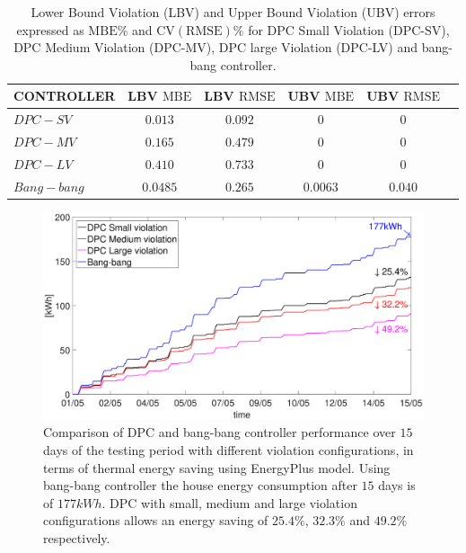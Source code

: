 \begin{table}[t!]
	\centering
	\begin{tabular}{lccccc}
		\toprule
		CONTROLLER  & LBV $\mathrm{MBE}$  & LBV $\mathrm{RMSE}$ & UBV $\mathrm{MBE}$ & UBV $\mathrm{RMSE}$ 	\\ 
		\midrule
		$DPC-SV$    & $0.013$             & $0.092$  			      & $0$    				 & $0$     	  	\\
		$DPC-MV$    & $0.165$ 			  & $0.479$     			  & $0$    				 & $0$		  	\\
		$DPC-LV$    & $0.410$  			  & $0.733$     			  & $0$    				 & $0$	      	\\
		$Bang-bang$ & $0.0485$ 			  & $0.265$    				  & $0.0063$ 		     & $0.040$	  	\\
		\bottomrule
	\end{tabular}
	\caption{Lower Bound Violation (LBV) and Upper Bound Violation (UBV) errors expressed as $\mathrm{MBE}\%$ and $\mathrm{CV(RMSE)}\%$ for DPC Small Violation (DPC-SV), DPC Medium Violation (DPC-MV), DPC large Violation (DPC-LV) and bang-bang controller.}
	\captionsetup{justification=centering}
	\label{T:violationErrors}
\end{table}
\begin{figure}[t!]
	\begin{center}
		\includegraphics[width=28pc]{figures/Energy_all_EnergyPlus.eps}
	\end{center}
	\caption{Comparison of DPC and bang-bang controller performance over $15$ days of the testing period with different violation configurations, in terms of thermal energy saving using EnergyPlus model. Using bang-bang controller the house energy consumption after $15$ days is of $177kWh$. DPC with small, medium and large violation configurations allows an energy saving of $25.4\%$, $32.3\%$ and $49.2\%$ respectively.}
	\label{F:comparison_all_energy_E+}
\end{figure}

